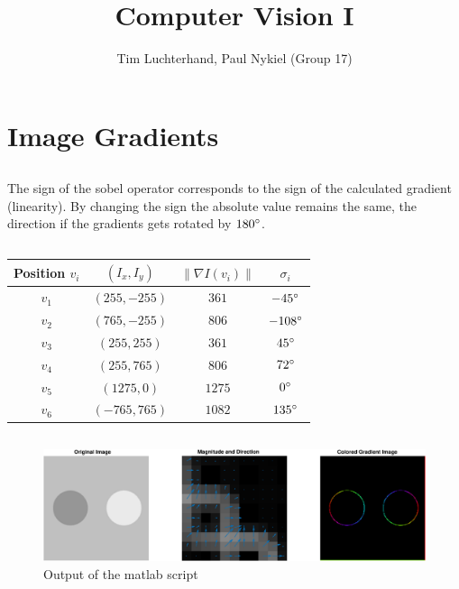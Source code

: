 \documentclass[DIN, pagenumber=false, fontsize=11pt, parskip=half]{scrartcl}
\title{Computer Vision I}
\author{Tim Luchterhand, Paul Nykiel (Group 17)}
\newcommand{\norm}[1]{\left\lVert#1\right\rVert}
\begin{document}
    \maketitle
    \section{Image Gradients}
    \subsection{}
    The sign of the sobel operator corresponds to the sign of the calculated gradient (linearity). By changing the sign the absolute value remains the same,
    the direction if the gradients gets rotated by $180 \degree$.
    \subsection{}
    \begin{table}[H]
        \centering
        \begin{tabular}{cccc}
            \toprule
            Position $v_i$ & $(I_x, I_y)$ & $\norm{\nabla I(v_i)}$ & $\sigma_i$ \\
            \midrule
            $v_1$ & $(255, -255)$ & $361$  & $-45\degree$ \\
            $v_2$ & $(765, -255)$ & $806$  & $-108\degree$ \\
            $v_3$ & $(255,  255)$ & $361$  & $45\degree$ \\
            $v_4$ & $(255,  765)$ & $806$  & $72\degree$ \\
            $v_5$ & $(1275,   0)$ & $1275$ & $0\degree$ \\
            $v_6$ & $(-765, 765)$ & $1082$ & $135\degree$\\
            \bottomrule
        \end{tabular}
    \end{table}
    \subsection{}
    
    \subsection{}
    \begin{figure}[H]
        \centering
        \includegraphics[width=\textwidth]{sh03ex01.eps}
        \caption{Output of the matlab script}
    \end{figure}
\end{document}

